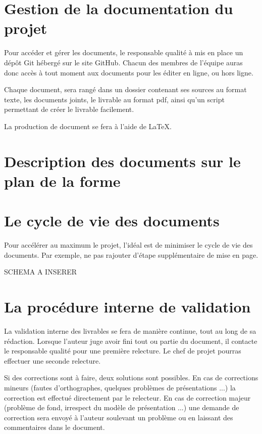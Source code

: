 \section{Gestion de la documentation du projet}

Pour accéder et gérer les documents, le responsable qualité à mis en place un dépôt Git hébergé sur le site GitHub.
Chacun des membres de l’équipe auras donc accès à tout moment aux documents pour les éditer en ligne, ou hors ligne.


Chaque document, sera rangé dans un dossier contenant ses sources au format texte, les documents joints, le livrable au format pdf, ainsi qu'un script permettant de créer le livrable facilement.

La production de document se fera à l’aide de LaTeX.


\section{Description des documents sur le plan de la forme}



\section{Le cycle de vie des documents}

Pour accélérer au maximum le projet, l’idéal est de minimiser le cycle de vie des documents.
Par exemple, ne pas rajouter d’étape supplémentaire de mise en page.

SCHEMA A INSERER %


\section{La procédure interne de validation}

La validation interne des livrables se fera de manière continue, tout au long de sa rédaction.
Lorsque l’auteur juge avoir fini tout ou partie du document, il contacte le responsable qualité pour une première relecture. Le chef de projet pourras effectuer une seconde relecture.

Si des corrections sont à faire, deux solutions sont possibles.
En cas de corrections mineurs (fautes d’orthographes, quelques problèmes de présentations ...) la correction est effectué directement par le relecteur.
En cas de correction majeur (problème de fond, irrespect du modèle de présentation ...) une demande de correction sera envoyé à l’auteur soulevant un problème ou en laissant des commentaires dans le document.

